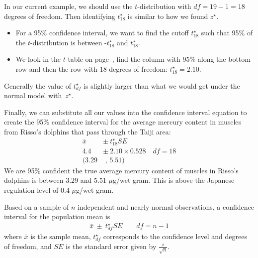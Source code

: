 In our current example, we should use the $t$-distribution with $df=19-1=18$ degrees of freedom. Then identifying $t_{18}^{\star}$ is similar to how we found $z^{\star}$.
\begin{itemize}
\setlength{\itemsep}{0mm}
\item For a 95\% confidence interval, we want to find the cutoff $t^{\star}_{18}$ such that 95\% of the $t$-distribution is between -$t^{\star}_{18}$ and $t^{\star}_{18}$.
\item We look in the $t$-table on page~\pageref{tTableSample_ch_inf_means}, find the column with 95\% along the bottom row and then the row with 18 degrees of freedom: $t^{\star}_{18} = 2.10$.
\end{itemize}
Generally the value of $t^{\star}_{df}$ is slightly larger than what we would get under the normal model with~$z^{\star}$.

Finally, we can substitute all our values into the confidence interval equation to create the 95\% confidence interval for the average mercury content in muscles from Risso's dolphins that pass through the Taiji area:
\begin{align*}
\bar{x} \ &\pm\  t^{\star}_{18}SE  \\
4.4 \ &\pm\  2.10 \times 0.528 \quad df=18 \\
(3.29 &\text{ , } 5.51)
\end{align*}
We are 95\% confident the true average mercury content of muscles in Risso's dolphins is between 3.29 and 5.51 $\mu$g/wet gram. This is above the Japanese regulation level of 0.4 $\mu$g/wet gram.


\begin{termBox}{
Based on a sample of $n$ independent and nearly normal observations, a confidence interval for the population mean is
\begin{eqnarray*}
\bar{x} \ \pm\  t^{\star}_{df}SE \quad \quad df=n-1
\end{eqnarray*}
where $\bar{x}$ is the sample mean, $t^{\star}_{df}$ corresponds to the confidence level and degrees of freedom, and $SE$ is the standard error given by $\frac{s}{\sqrt{n}}$.}
\end{termBox}

